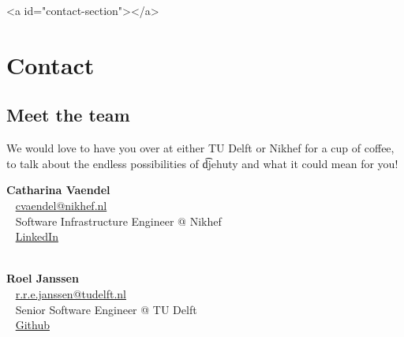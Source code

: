 \ifdefined\HCode
\begin{html}
<a id="contact-section"></a>
\end{html}
\fi
\chapter*{Contact}

\section*{Meet the team}

We would love to have you over at either TU Delft or Nikhef for a cup
of coffee, to talk about the endless possibilities of \t{djehuty} and
what it could mean for you!

\textbf{Catharina Vaendel}\\~
\href{mailto:cvaendel@nikhef.nl}{cvaendel@nikhef.nl}\\~
Software Infrastructure Engineer @ Nikhef\\~
\href{https://www.linkedin.com/in/catharinavaendel}{LinkedIn}\\~

\textbf{Roel Janssen}\\~
\href{mailto:r.r.e.janssen@tudelft.nl}{r.r.e.janssen@tudelft.nl}\\~
Senior Software Engineer @ TU Delft\\~
\href{https://github.com/roelj}{Github}

